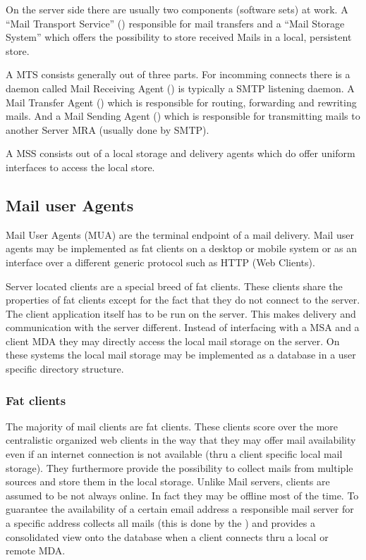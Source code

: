 On the server side there are usually two components (software sets) at work. A ``Mail Transport Service'' () responsible for mail transfers and a ``Mail Storage System'' which offers the possibility to store received Mails in a local, persistent store.\par

A MTS consists generally out of three parts. For incomming connects there is a daemon called Mail Receiving Agent () is typically a SMTP listening daemon. A Mail Transfer Agent () which is responsible for routing, forwarding and rewriting mails. And a Mail Sending Agent () which is responsible for transmitting mails to another Server MRA (usually done by SMTP).\par

A MSS consists out of a local storage and delivery agents which do offer uniform interfaces to access the local store.\par

\subsection{Mail user Agents}
Mail User Agents (MUA) are the terminal endpoint of a mail delivery. Mail user agents may be implemented as fat clients on a desktop or mobile system or as an interface over a different generic protocol such as HTTP (Web Clients). \par

Server located clients are a special breed of fat clients. These clients share the properties of fat clients except for the fact that they do not connect to the server. The client application itself has to be run on the server. This makes delivery and communication with the server different. Instead of interfacing with a MSA and a client MDA they may directly access the local mail storage on the server. On these systems the local mail storage may be implemented as a database in a user specific directory structure.

\subsubsection{Fat clients}
The majority of mail clients are fat clients. These clients score over the more centralistic organized web clients in the way that they may offer mail availability even if an internet connection is not available (thru a client specific local mail storage). They furthermore provide the possibility to collect mails from multiple sources and store them in the local storage. Unlike Mail servers, clients are assumed to be not always online. In fact they may be offline most of the time. To guarantee the availability of a certain email address a responsible mail server for a specific address collects all mails (this is done by the ) and provides a consolidated view onto the database when a client connects thru a local or remote MDA.\par

